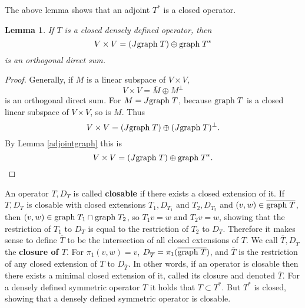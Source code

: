 \documentclass{article}
\newcommand{\graph}{\ensuremath\mathrm{graph}\;}
\newtheorem{lemma}[theorem]{Lemma}
\theoremstyle{definition}
\begin{document}
The above lemma shows that an adjoint $T^*$ is a closed operator.

\begin{lemma}
If  $T$ is a closed densely defined  operator, then
\[
V \times V = (J\graph T) \oplus \graph T^*
\]
is an  orthogonal direct sum.
\label{directsum}
\end{lemma}
\begin{proof}
Generally, if $M$ is a linear subspace of $V \times V$,
\[
V \times V = \overline{M} \oplus M^\perp
\]
is an orthogonal direct sum. For $M = J \graph T$, because $\graph T$ is a closed linear subspace of $V \times V$, so
is $M$. Thus
\[
V \times V = (J\graph T) \oplus (J \graph T)^\perp.
\]
By Lemma \ref{adjointgraph} this is
\[
V \times V =  (J\graph T) \oplus \graph T^*.
\] 
\end{proof}

An operator $T,D_T$ is called \textbf{closable} if there exists a closed extension of it. 
If $T,D_T$ is closable with
closed extensions $T_1,D_{T_1}$ and
$T_2,D_{T_2}$ and $(v,w) \in \overline{\graph T}$,
then $(v,w) \in \graph T_1 \cap \graph T_2$, so
$T_1v=w$ and $T_2v=w$, showing that the restriction of $T_1$ to $D_T$ is equal to the restriction of $T_2$ to $D_T$.
Therefore it makes sense to define $\overline{T}$ to be the intersection of all
closed extensions of $T$. We call $\overline{T},D_{\overline{T}}$ the \textbf{closure of $T$}. For
$\pi_1(v,w)=v$,  $D_{\overline{T}} = \pi_1 (\overline{\graph T})$, and
$\overline{T}$ is the restriction of any closed extension of $T$ to $D_{\overline{T}}$.
In other words, if an operator is closable then there exists a minimal
closed extension of it, called its closure and denoted $\overline{T}$. 
For a densely defined symmetric operator $T$ it holds that $T \subset T^*$. 
But $T^*$ is closed, showing that a densely defined symmetric operator is closable.
\end{document}
